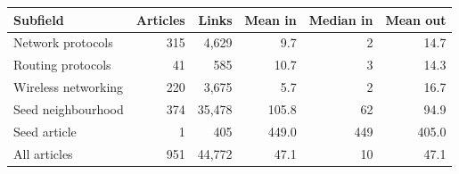 
\begin{tabular}{lrrrrr}
\toprule
Subfield & Articles & Links & Mean in & Median in & Mean out\\
\midrule
Network protocols & 315 & 4,629 & 9.7 & 2 & 14.7\\
Routing protocols & 41 & 585 & 10.7 & 3 & 14.3\\
Wireless networking & 220 & 3,675 & 5.7 & 2 & 16.7\\
Seed neighbourhood & 374 & 35,478 & 105.8 & 62 & 94.9\\
Seed article & 1 & 405 & 449.0 & 449 & 405.0\\
All articles & 951 & 44,772 & 47.1 & 10 & 47.1\\
\bottomrule
\end{tabular}
